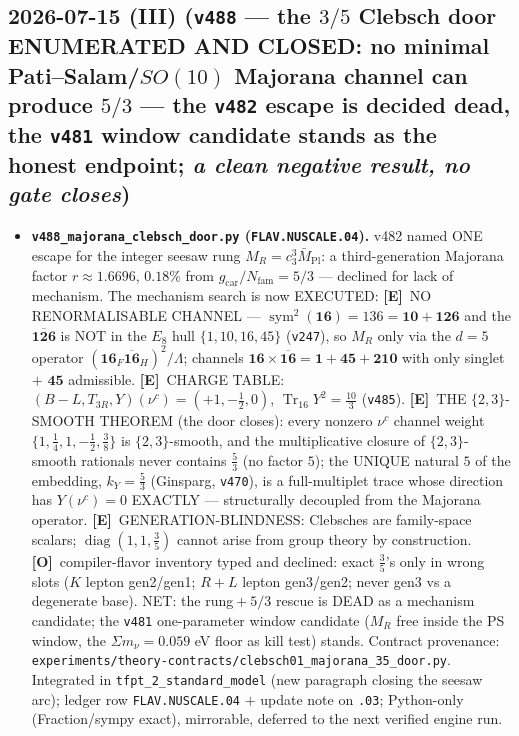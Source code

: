 \documentclass[11pt]{article}
\providecommand{\mE}{\textbf{[E]}}\providecommand{\mC}{\textbf{[C]}}
\providecommand{\mO}{\textbf{[O]}}\providecommand{\mX}{\textbf{[X]}}
\providecommand{\gcar}{g_{\mathrm{car}}}\providecommand{\Nfam}{N_{\mathrm{fam}}}
\providecommand{\Mbar}{\bar M_{\mathrm{Pl}}}\providecommand{\Z}{\mathbb{Z}}\providecommand{\PP}{\mathbb{P}}
\begin{document}
\subsection*{2026-07-15 (III) (\texttt{v488} --- the $3/5$ Clebsch door ENUMERATED AND CLOSED: no minimal Pati--Salam/$SO(10)$ Majorana channel can produce $5/3$ --- the \texttt{v482} escape is decided dead, the \texttt{v481} window candidate stands as the honest endpoint; \emph{a clean negative result, no gate closes})}
\begin{itemize}[leftmargin=1.5em]
\item \textbf{\texttt{v488\_majorana\_clebsch\_door.py} (\texttt{FLAV.NUSCALE.04}).} v482 named ONE escape
for the integer seesaw rung $M_R=c_3^3\Mbar$: a third-generation Majorana factor $r\approx1.6696$, $0.18\%$
from $\gcar/\Nfam=5/3$ --- declined for lack of mechanism. The mechanism search is now EXECUTED: \mE\ NO
RENORMALISABLE CHANNEL --- $\operatorname{sym}^2(\mathbf{16})=136=\mathbf{10}+\mathbf{126}$ and the
$\overline{\mathbf{126}}$ is NOT in the $E_8$ hull $\{1,10,16,45\}$ (\texttt{v247}), so $M_R$ only via the
$d{=}5$ operator $(\mathbf{16}_F\overline{\mathbf{16}}_H)^2/\Lambda$; channels
$\mathbf{16}\times\overline{\mathbf{16}}=\mathbf{1}+\mathbf{45}+\mathbf{210}$ with only singlet $+$
$\mathbf{45}$ admissible. \mE\ CHARGE TABLE: $(B{-}L,T_{3R},Y)(\nu^c)=(+1,-\tfrac12,0)$,
$\operatorname{Tr}_{16}Y^2=\tfrac{10}3$ (\texttt{v485}). \mE\ THE $\{2,3\}$-SMOOTH THEOREM (the door closes):
every nonzero $\nu^c$ channel weight $\{1,\tfrac14,1,-\tfrac12,\tfrac38\}$ is $\{2,3\}$-smooth, and the
multiplicative closure of $\{2,3\}$-smooth rationals never contains $\tfrac53$ (no factor $5$); the UNIQUE
natural $5$ of the embedding, $k_Y=\tfrac53$ (Ginsparg, \texttt{v470}), is a full-multiplet trace whose
direction has $Y(\nu^c)=0$ EXACTLY --- structurally decoupled from the Majorana operator. \mE\
GENERATION-BLINDNESS: Clebsches are family-space scalars; $\operatorname{diag}(1,1,\tfrac35)$ cannot arise
from group theory by construction. \mO\ compiler-flavor inventory typed and declined: exact $\tfrac35$'s only
in wrong slots ($K$ lepton gen2/gen1; $R+L$ lepton gen3/gen2; never gen3 vs a degenerate base). NET: the
rung${}+{}5/3$ rescue is DEAD as a mechanism candidate; the \texttt{v481} one-parameter window candidate
($M_R$ free inside the PS window, the $\Sigma m_\nu=0.059$ eV floor as kill test) stands. Contract
provenance: \texttt{experiments/theory-contracts/clebsch01\_majorana\_35\_door.py}. Integrated in
\texttt{tfpt\_2\_standard\_model} (new paragraph closing the seesaw arc); ledger row
\texttt{FLAV.NUSCALE.04} $+$ update note on \texttt{.03}; Python-only (Fraction/sympy exact), mirrorable,
deferred to the next verified engine run.
\end{itemize}
\end{document}
